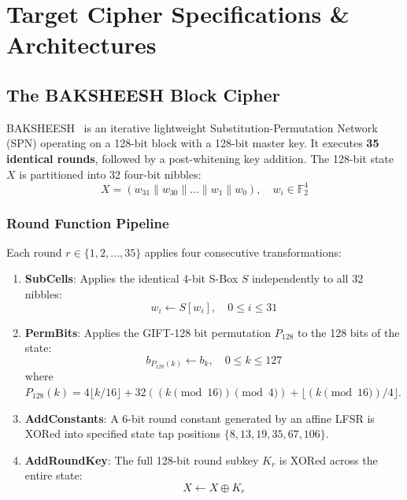 \chapter{Target Cipher Specifications \& Architectures}
\label{ch:ciphers}

\section{The BAKSHEESH Block Cipher}
\label{sec:baksheesh_spec}
BAKSHEESH~\cite{baksi2023baksheesh} is an iterative lightweight Substitution-Permutation Network (SPN) operating on a 128-bit block with a 128-bit master key. It executes \textbf{35 identical rounds}, followed by a post-whitening key addition. The 128-bit state $X$ is partitioned into 32 four-bit nibbles:
\begin{equation}
    X = (w_{31} \parallel w_{30} \parallel \dots \parallel w_1 \parallel w_0), \quad w_i \in \mathbb{F}_2^4
\end{equation}

\subsection{Round Function Pipeline}
Each round $r \in \{1, 2, \dots, 35\}$ applies four consecutive transformations:
\begin{enumerate}
    \item \textbf{SubCells}: Applies the identical 4-bit S-Box $S$ independently to all 32 nibbles:
    \begin{equation}
        w_i \leftarrow S[w_i], \quad 0 \le i \le 31
    \end{equation}
    \item \textbf{PermBits}: Applies the GIFT-128 bit permutation $P_{128}$ to the 128 bits of the state:
    \begin{equation}
        b_{P_{128}(k)} \leftarrow b_k, \quad 0 \le k \le 127
    \end{equation}
    where $P_{128}(k) = 4 \lfloor k / 16 \rfloor + 32 ((k \pmod{16}) \pmod 4) + \lfloor (k \pmod{16}) / 4 \rfloor$.
    \item \textbf{AddConstants}: A 6-bit round constant generated by an affine LFSR is XORed into specified state tap positions $\{8, 13, 19, 35, 67, 106\}$.
    \item \textbf{AddRoundKey}: The full 128-bit round subkey $K_r$ is XORed across the entire state:
    \begin{equation}
        X \leftarrow X \oplus K_r
    \end{equation}
\end{enumerate}

